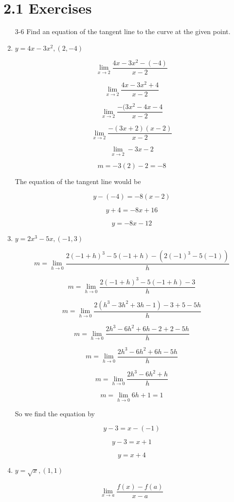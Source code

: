 \documentclass{article}
\begin{document}
	\section{2.1 Exercises}

	\begin{enumerate}
		\item[3-6] Find an equation of the tangent line to the curve at the given point.
		\item $y = 4x - 3x^2, (2, -4)$

			$$\lim \limits _{x \to 2} \frac{4x - 3x^2 - (-4)}{x-2}$$

			$$\lim \limits _{x \to 2} \frac{4x - 3x^2 + 4}{x-2}$$

			$$\lim \limits _{x \to 2} \frac{-(3x^2 - 4x - 4}{x-2}$$

			$$\lim \limits _{x \to 2} \frac{-(3x+2)(x-2)}{x-2}$$

			$$\lim \limits _{x \to 2} -3x-2$$

			$$m = -3(2) - 2 = -8$$

			The equation of the tangent line would be

			$$y - (-4) = -8(x - 2)$$

			$$y + 4 = -8x + 16$$
			
			$$y = -8x - 12$$

		\item $y = 2x^3 - 5x, (-1, 3)$

			$$m = \lim \limits _{h \to 0} \frac{2(-1+h)^3 - 5(-1+h) - (2(-1)^3 - 5(-1))}{h}$$

			$$m = \lim \limits _{h \to 0} \frac{2(-1+h)^3 - 5(-1 + h) - 3}{h}$$

			$$m = \lim \limits _{h \to 0} \frac{2(h^3 - 3h^2 + 3h -1) -3 + 5 - 5h}{h}$$

			$$m = \lim \limits _{h \to 0} \frac{2h^3 - 6h^2 + 6h -2 + 2 - 5h}{h}$$

			$$m = \lim \limits _{h \to 0} \frac{2h^3 - 6h^2 + 6h - 5h}{h}$$

			$$m = \lim \limits _{h \to 0} \frac{2h^3 - 6h^2 + h}{h}$$

			$$m = \lim \limits _{h \to 0} 6h + 1 = 1$$

			So we find the equation by

			$$y - 3 = x - (-1)$$

			$$y - 3 = x + 1$$

			$$y = x + 4$$
		\item $y = \sqrt{x}, (1,1)$

			$$\lim \limits _{x \to a} \frac{f(x) - f(a)}{x - a}$$


\end{enumerate}
\end{document}
